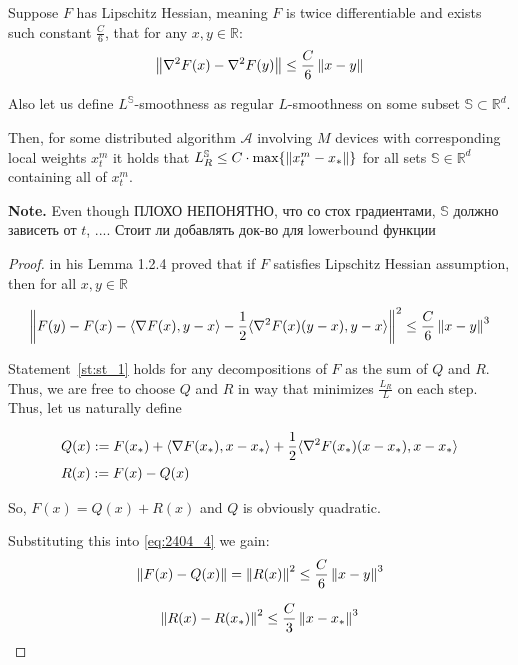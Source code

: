 \begin{lemma} \label{lem:decay_eps}
    Suppose $F$ has Lipschitz Hessian, meaning $F$ is twice differentiable and exists such constant $\frac{C}{6}$, that for any $x, y \in \mathbb{R}$:
    \begin{align}
        \left\|\nabla^2 F(x) - \nabla^2 F(y)\right\| \leq \frac{C}{6} \left\|x-y\right\|
    \end{align}

    Also let us define $L^{\mathbb{S}}$-smoothness as regular $L$-smoothness on some subset $\mathbb{S} \subset \mathbb{R}^d$.

    Then, for some distributed algorithm $\mathcal{A}$ involving $M$ devices with corresponding local weights $x^m_t$ it holds that $L^\mathbb{S}_R \leq C \cdot \text{max} \{ \left\|x^m_t - x_*\right\| \}$ for all sets $\mathbb{S} \in \mathbb{R}^d$ containing all of $x^m_t$.

    \textbf{Note.} Even though ПЛОХО НЕПОНЯТНО, что со стох градиентами, $\mathbb{S}$ должно зависеть от $t$, .... Стоит ли добавлять док-во для lowerbound функции

    \begin{proof}
    \cite{Nesterov} in his Lemma 1.2.4 proved that if $F$ satisfies Lipschitz Hessian assumption, then for all $x, y \in \mathbb{R}$

    \begin{align}
         \left\|F(y) - F(x) - \langle \nabla F(x), y-x\rangle - \frac{1}{2}\langle \nabla^2 F(x)(y-x), y-x\rangle\right\|^2 \leq \frac{C}{6} \left\|x-y\right\|^3 \label{eq:2404_4}
    \end{align}    
    
    Statement~\ref{st:st_1} holds for any decompositions of $F$ as the sum of $Q$ and $R$. Thus, we are free to choose $Q$ and $R$ in way that minimizes $\frac{L_R}{L}$ on each step. Thus, let us naturally define 

    \begin{align}
        &Q(x) := F(x_*) + \langle \nabla F(x_*), x-x_*\rangle + \frac{1}{2} \langle \nabla^2 F(x_*)(x-x_*), x-x_*\rangle \\
        &R(x) := F(x) - Q(x)
    \end{align}

    So, $F(x) = Q(x) + R(x)$ and $Q$ is obviously quadratic.

    Substituting this into \eqref{eq:2404_4} we gain:
    \begin{align}
        \left\|F(x) - Q(x)\right\| = \left\|R(x)\right\|^2 \leq \frac{C}{6} \left\|x-y\right\|^3
    \end{align}


    \begin{align}
        \left\|R(x) - R(x_*)\right\|^2 \leq \frac{C}{3} \left\|x-x_*\right\|^3
    \end{align}

   

    \end{proof}
\end{lemma}